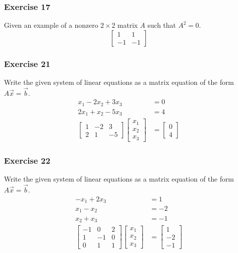 \documentclass{math}
\begin{document}
\subsubsection*{Exercise 17}
Given an example of a nonzero \( 2\times2 \) matrix \( A \) such that
\( A^2 = 0 \).
\[ \begin{bmatrix}1 & 1 \\ -1 & -1\end{bmatrix} \]

\subsubsection*{Exercise 21}
Write the given system of linear equations as a matrix equation of the form
\( A\vec{x} = \vec{b} \).
\begin{align*}
  x_1-2x_2+3x_3 &= 0 \\
  2x_1+x_2-5x_3 &= 4 \\
  \begin{bmatrix}
    1 & -2 & 3 \\
    2 & 1 & -5
  \end{bmatrix}\begin{bmatrix}
    x_1 \\ x_2 \\ x_3
  \end{bmatrix} &= \begin{bmatrix}
    0 \\ 4
  \end{bmatrix}
\end{align*}

\subsubsection*{Exercise 22}
Write the given system of linear equations as a matrix equation of the form
\( A\vec{x} = \vec{b} \).
\begin{align*}
  -x_1 + 2x_3 &= 1 \\
  x_1-x_2 &= -2 \\
  x_2+x_3 &= -1 \\
  \begin{bmatrix}
    -1 & 0 & 2 \\
    1 & -1 & 0 \\
    0 & 1 & 1
  \end{bmatrix}\begin{bmatrix}
    x_1 \\ x_2 \\ x_3
  \end{bmatrix} &= \begin{bmatrix}
    1 \\ -2 \\ -1
  \end{bmatrix}
\end{align*}
\end{document}
